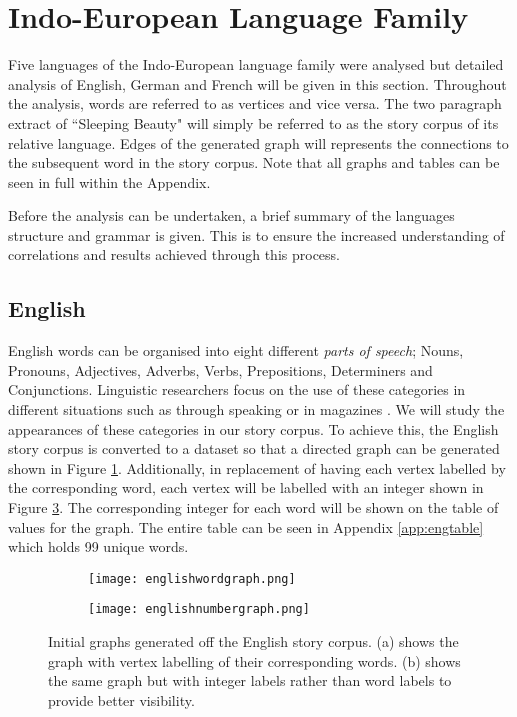 \section{Indo-European Language Family}
Five languages of the Indo-European language family were analysed but detailed analysis of English, German and French will be given in this section. Throughout the analysis, words are referred to as vertices and vice versa. The two paragraph extract of ``Sleeping Beauty" will simply be referred to as the story corpus of its relative language. Edges of the generated graph will represents the connections to the subsequent word in the story corpus. Note that all graphs and tables can be seen in full within the Appendix.

Before the analysis can be undertaken, a brief summary of the languages structure and grammar is given. This is to ensure the increased understanding of correlations and results achieved through this process.

\subsection{English}
English words can be organised into eight different \emph{parts of speech}; Nouns, Pronouns, Adjectives, Adverbs, Verbs, Prepositions, Determiners and Conjunctions. Linguistic researchers focus on the use of these categories in different situations such as through speaking or in magazines \cite{khaisaeng2017study}. We will study the appearances of these categories in our story corpus. To achieve this, the English story corpus is converted to a dataset so that a directed graph can be generated shown in Figure \ref{fig:engword}. Additionally, in replacement of having each vertex labelled by the corresponding word, each vertex will be labelled with an integer shown in Figure \ref{fig:engnum}. The corresponding integer for each word will be shown on the table of values for the graph. The entire table can be seen in Appendix \ref{app:engtable} which holds 99 unique words.

\begin{figure}[!htb]
\centering
\begin{subfigure}{.45\textwidth}
	\texttt{[image: englishwordgraph.png]}
	\caption{}
	\label{fig:engword}
\end{subfigure}
\hfill
\begin{subfigure}{.45\textwidth}
	\texttt{[image: englishnumbergraph.png]}
	\caption{}
	\label{fig:engnum}
\end{subfigure}
\caption{Initial graphs generated off the English story corpus. (a) shows the graph with vertex labelling of their corresponding words. (b) shows the same graph but with integer labels rather than word labels to provide better visibility.}
\end{figure}

